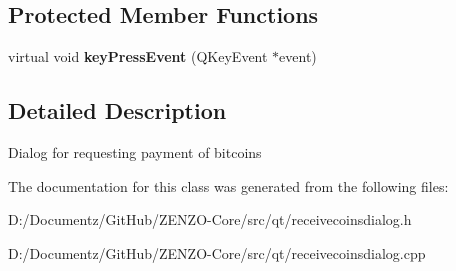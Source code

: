 \subsection*{Protected Member Functions}
\begin{DoxyCompactItemize}
\item 
\mbox{\label{class_receive_coins_dialog_abcf17b510c473bf3e94ef12f7f5cfc10}} 
virtual void {\bfseries key\+Press\+Event} (Q\+Key\+Event $\ast$event)
\end{DoxyCompactItemize}


\subsection{Detailed Description}
Dialog for requesting payment of bitcoins 

The documentation for this class was generated from the following files\+:\begin{DoxyCompactItemize}
\item 
D\+:/\+Documentz/\+Git\+Hub/\+Z\+E\+N\+Z\+O-\/\+Core/src/qt/receivecoinsdialog.\+h\item 
D\+:/\+Documentz/\+Git\+Hub/\+Z\+E\+N\+Z\+O-\/\+Core/src/qt/receivecoinsdialog.\+cpp\end{DoxyCompactItemize}
